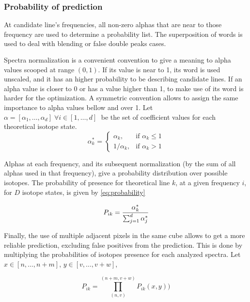 \subsubsection{Probability of prediction}
At candidate line's frequencies, all non-zero alphas that are near to those frequency are used to determine a probability list. The superposition of words is used to deal with blending or false double peaks cases.

Spectra normalization is a convenient convention to give a meaning to alpha values scooped at range $(0,1)$.
If its value is near to 1, its word is used unscaled, and it has an higher probability to be describing candidate lines.
If an alpha value is closer to 0 or has a value higher than 1, to make use of its word is harder for the optimization. 
A symmetric convention allows to assign the same importance to alpha values bellow and over 1.
Let $\alpha = [ \alpha_1, \ldots,  \alpha_d] \; \forall i \in [1, \ldots, d] \;$ be the set of coefficient values for each theoretical isotope state.
\begin{equation}
\alpha^{*}_{k}\text{ = }
\begin{cases}
\alpha_{k},& \text{if } \alpha_{k} \le 1\\
1/\alpha_{k}, & \text{if } \alpha_{k} > 1
\end{cases}
\label{eq:alpha}
\end{equation}

Alphas at each frequency, and its subsequent normalization (by the sum of all alphas used in that frequency), give a probability distribution over possible isotopes.
The probability of presence for theoretical line $k$, at a given frequency $i$, for $D$ isotope states, is given by \ref{eq:probability} 

\begin{equation}
P_{ik} = \cfrac{\alpha^{*}_k}{\sum_{j=1}^{d} \alpha^{*}_j}
\label{eq:probability}
\end{equation}

Finally, the use of multiple adjacent pixels in the same cube allows to get a more reliable prediction, excluding false positives from the prediction.
This is done by multiplying the probabilities of isotopes presence for each analyzed spectra. Let $x \in [n, \ldots, n + m]$, $y \in [v, \ldots, v + w]$, 

\begin{equation}
P_{ik} = \prod_{(n, v)}^{(n + m, v + w)} P_{ik}{(x, y)})
\label{eq:multiple}
\end{equation}


